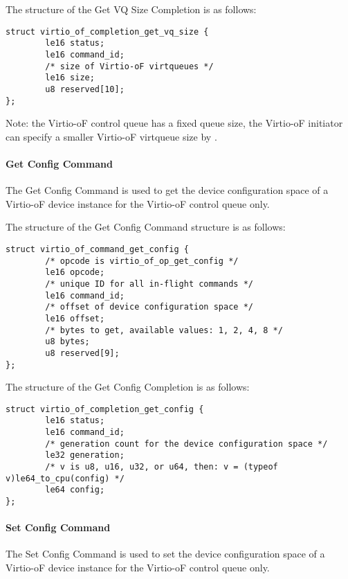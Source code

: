 The structure of the Get VQ Size Completion is as follows:
\begin{lstlisting}
struct virtio_of_completion_get_vq_size {
        le16 status;
        le16 command_id;
        /* size of Virtio-oF virtqueues */
        le16 size;
        u8 reserved[10];
};
\end{lstlisting}

Note: the Virtio-oF control queue has a fixed queue size, the Virtio-oF initiator can specify a smaller Virtio-oF virtqueue size by
.

\paragraph{Get Config Command}\label{sec:Virtio Transport Options / Virtio Over Fabrics / Commands Definition / Opcodes / Get Config Command}
The Get Config Command is used to get the device configuration space of a Virtio-oF device instance for the Virtio-oF control queue only.

The structure of the Get Config Command structure is as follows:
\begin{lstlisting}
struct virtio_of_command_get_config {
        /* opcode is virtio_of_op_get_config */
        le16 opcode;
        /* unique ID for all in-flight commands */
        le16 command_id;
        /* offset of device configuration space */
        le16 offset;
        /* bytes to get, available values: 1, 2, 4, 8 */
        u8 bytes;
        u8 reserved[9];
};
\end{lstlisting}

The structure of the Get Config Completion is as follows:
\begin{lstlisting}
struct virtio_of_completion_get_config {
        le16 status;
        le16 command_id;
        /* generation count for the device configuration space */
        le32 generation;
        /* v is u8, u16, u32, or u64, then: v = (typeof v)le64_to_cpu(config) */
        le64 config;
};
\end{lstlisting}

\paragraph{Set Config Command}\label{sec:Virtio Transport Options / Virtio Over Fabrics / Commands Definition / Opcodes / Set Config Command}
The Set Config Command is used to set the device configuration space of a Virtio-oF device instance for the Virtio-oF control queue only.

